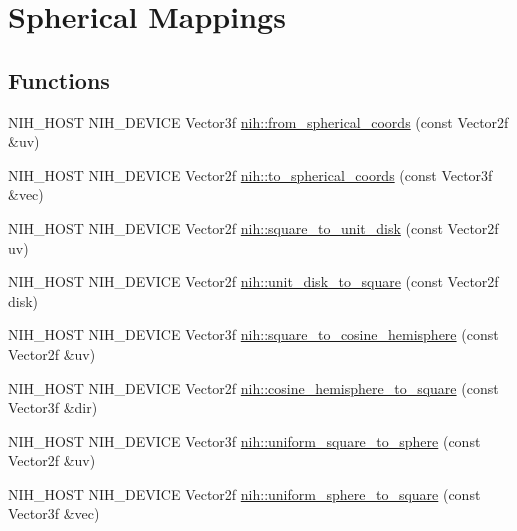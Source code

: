 \hypertarget{group__spherical__mappings}{
\section{\-Spherical \-Mappings}
\label{group__spherical__mappings}
}
\subsection*{\-Functions}
\begin{DoxyCompactItemize}
\item 
\-N\-I\-H\-\_\-\-H\-O\-S\-T \-N\-I\-H\-\_\-\-D\-E\-V\-I\-C\-E \-Vector3f \hyperlink{group__spherical__mappings_gabb50d34723dc8f63f83481dda7e4538a}{nih\-::from\-\_\-spherical\-\_\-coords} (const \-Vector2f \&uv)
\item 
\-N\-I\-H\-\_\-\-H\-O\-S\-T \-N\-I\-H\-\_\-\-D\-E\-V\-I\-C\-E \-Vector2f \hyperlink{group__spherical__mappings_gae14d642cb444062ebf966fc27f379972}{nih\-::to\-\_\-spherical\-\_\-coords} (const \-Vector3f \&vec)
\item 
\-N\-I\-H\-\_\-\-H\-O\-S\-T \-N\-I\-H\-\_\-\-D\-E\-V\-I\-C\-E \-Vector2f \hyperlink{group__spherical__mappings_ga5852f54031a04a3c2622ac9c1c3ee181}{nih\-::square\-\_\-to\-\_\-unit\-\_\-disk} (const \-Vector2f uv)
\item 
\-N\-I\-H\-\_\-\-H\-O\-S\-T \-N\-I\-H\-\_\-\-D\-E\-V\-I\-C\-E \-Vector2f \hyperlink{group__spherical__mappings_ga4c1322b35d3548385cfbcde647eaa9b6}{nih\-::unit\-\_\-disk\-\_\-to\-\_\-square} (const \-Vector2f disk)
\item 
\-N\-I\-H\-\_\-\-H\-O\-S\-T \-N\-I\-H\-\_\-\-D\-E\-V\-I\-C\-E \-Vector3f \hyperlink{group__spherical__mappings_ga8b4bb2387e2dcc609267e00777c753d1}{nih\-::square\-\_\-to\-\_\-cosine\-\_\-hemisphere} (const \-Vector2f \&uv)
\item 
\-N\-I\-H\-\_\-\-H\-O\-S\-T \-N\-I\-H\-\_\-\-D\-E\-V\-I\-C\-E \-Vector2f \hyperlink{group__spherical__mappings_ga1e65205c0882ccfa8b8cea7ab18525ce}{nih\-::cosine\-\_\-hemisphere\-\_\-to\-\_\-square} (const \-Vector3f \&dir)
\item 
\-N\-I\-H\-\_\-\-H\-O\-S\-T \-N\-I\-H\-\_\-\-D\-E\-V\-I\-C\-E \-Vector3f \hyperlink{group__spherical__mappings_ga711e9a117559053c96478f404aa2a278}{nih\-::uniform\-\_\-square\-\_\-to\-\_\-sphere} (const \-Vector2f \&uv)
\item 
\-N\-I\-H\-\_\-\-H\-O\-S\-T \-N\-I\-H\-\_\-\-D\-E\-V\-I\-C\-E \-Vector2f \hyperlink{group__spherical__mappings_ga74d80bd5bc66492ae691520586329be5}{nih\-::uniform\-\_\-sphere\-\_\-to\-\_\-square} (const \-Vector3f \&vec)
\end{DoxyCompactItemize}



